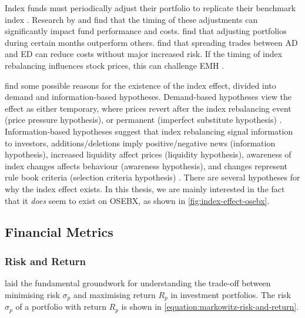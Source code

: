 Index funds must periodically adjust their portfolio to replicate their benchmark index \parencite{investopedia-passive-and-active-funds}. Research by \textcite{blitz-fundamental-indexation-rebalancing-assumptions-and-performance} and \textcite{madhavan-the-hidden-cost-of-index-rebalancing} find that the timing of these adjustments can significantly impact fund performance and costs. \textcite{blitz-fundamental-indexation-rebalancing-assumptions-and-performance} find that adjusting portfolios during certain months outperform others. \textcite{madhavan-the-hidden-cost-of-index-rebalancing} find that spreading trades between AD and ED can reduce costs without major increased risk. If the timing of index rebalancing influences stock prices, this can challenge EMH \parencite{fama-the-adjustment-of-stock-prices-to-new-information}.

\textcite{afego-effects-of-changes-in-stock-index-composition} find some possible reasons for the existence of the index effect, divided into demand and information-based hypotheses. Demand-based hypotheses view the effect as either temporary, where prices revert after the index rebalancing event (price pressure hypothesis), or permanent (imperfect substitute hypothesis) \parencite{afego-effects-of-changes-in-stock-index-composition}. Information-based hypotheses suggest that index rebalancing signal information to investors, additions/deletions imply positive/negative news (information hypothesis), increased liquidity affect prices (liquidity hypothesis), awareness of index changes affects behaviour (awareness hypothesis), and changes represent rule book criteria (selection criteria hypothesis) \parencite{afego-effects-of-changes-in-stock-index-composition}. There are several hypotheses for why the index effect exists. In this thesis, we are mainly interested in the fact that it \textit{does} seem to exist on OSEBX, as shown in \autoref{fig:index-effect-osebx}. 

\subsection{Financial Metrics}

\subsubsection{Risk and Return}

\textcite{markowitz-portfolio-selection} laid the fundamental groundwork for understanding the trade-off between minimising risk $\sigma_p$ and maximising return $R_p$ in investment portfolios. The risk $\sigma_p$ of a portfolio with return $R_p$ is shown in \autoref{equation:markowitz-risk-and-return}.

